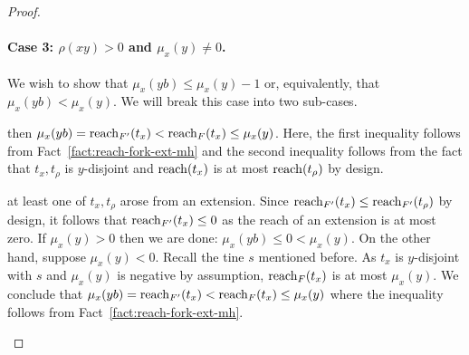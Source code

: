 \begin{proof}
\begin{description}[font=\normalfont\itshape\space]
    \end{description}



  \paragraph{Case 3: $\rho(xy)>0$ and $\mu_x(y)\neq0$.}
    We wish to show that $\mu_x(yb) \leq \mu_x(y) - 1$ 
    or, equivalently, that $\mu_x(yb) < \mu_x(y)$. 
    We will break this case into two sub-cases. 
    \begin{description}[font=\normalfont\itshape\space]
      \item[If both $t_\rho, t_x \in F$,] 
      then $\mu_x(yb) = \operatorname{reach}_{F'}(t_x) < \operatorname{reach}_{F}(t_x) \leq \mu_x(y)$. 
      Here, the first inequality follows from Fact~\ref{fact:reach-fork-ext-mh} 
      and the second inequality follows from the fact that 
      $t_x, t_\rho$ is $y$-disjoint and 
      $\operatorname{reach}(t_x)$ is at most $\operatorname{reach}(t_\rho)$ by design.

      \item[Otherwise,] 
      at least one of $t_x, t_\rho$ arose from an extension. 
      Since $\operatorname{reach}_{F'}(t_x) \leq \operatorname{reach}_{F'}(t_\rho)$ by design, 
      it follows that $\operatorname{reach}_{F'}(t_x) \leq 0$ 
      as the reach of an extension is at most zero.
      If $\mu_x(y) > 0$ then we are done: $\mu_x(yb) \leq 0 < \mu_x(y)$.  
      On the other hand, suppose $\mu_x(y) < 0$. 
      Recall the tine $s$ mentioned before.
      As $t_x$ is $y$-disjoint with $s$ and 
      $\mu_x(y)$ is negative by assumption, 
      $\operatorname{reach}_F(t_x)$ is at most $\mu_x(y)$. 
      We conclude that 
      $
      \mu_x(yb) = \operatorname{reach}_{F'}(t_x) 
      < \operatorname{reach}_F(t_x) 
      \leq \mu_x(y)
      $ 
      where the inequality follows from Fact~\ref{fact:reach-fork-ext-mh}.




\end{description}
\end{proof}
